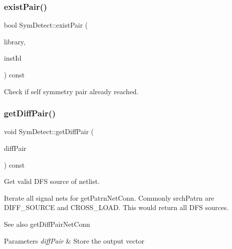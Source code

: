 \subsubsection{\texorpdfstring{exist\+Pair()}{existPair()}\hspace{0.1cm}{\footnotesize\ttfamily [2/2]}}
{\footnotesize\ttfamily bool Sym\+Detect\+::exist\+Pair (\begin{DoxyParamCaption}\item[{std\+::vector$<$ \hyperlink{classMosPair}{Mos\+Pair} $>$ \&}]{library,  }\item[{\hyperlink{type_8h_a581e8093e28e7362f2b6937296190676}{Index\+Type}}]{inst\+Id }\end{DoxyParamCaption}) const\hspace{0.3cm}{\ttfamily [private]}}

Check if self symmetry pair already reached. \mbox{\label{classSymDetect_af04b93dac7e090cef8e741d8d1812485}} 
\subsubsection{\texorpdfstring{get\+Diff\+Pair()}{getDiffPair()}}
{\footnotesize\ttfamily void Sym\+Detect\+::get\+Diff\+Pair (\begin{DoxyParamCaption}\item[{std\+::vector$<$ \hyperlink{classMosPair}{Mos\+Pair} $>$ \&}]{diff\+Pair }\end{DoxyParamCaption}) const\hspace{0.3cm}{\ttfamily [private]}}



Get valid D\+FS source of netlist. 

Iterate all signal nets for get\+Patrn\+Net\+Conn. Commonly srch\+Patrn are D\+I\+F\+F\+\_\+\+S\+O\+U\+R\+CE and C\+R\+O\+S\+S\+\_\+\+L\+O\+AD. This would return all D\+FS sources.

\begin{DoxySeeAlso}{See also}
get\+Diff\+Pair\+Net\+Conn 
\end{DoxySeeAlso}

\begin{DoxyParams}{Parameters}
{\em diff\+Pair} & Store the output vector \\
\hline
\end{DoxyParams}
\mbox{\label{classSymDetect_af7d1b22086aa98a27b1eafc9266596d8}} 
